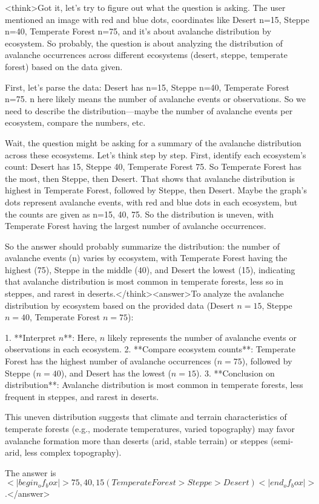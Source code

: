 <think>Got it, let's try to figure out what the question is asking. The user mentioned an image with red and blue dots, coordinates like Desert n=15, Steppe n=40, Temperate Forest n=75, and it's about avalanche distribution by ecosystem. So probably, the question is about analyzing the distribution of avalanche occurrences across different ecosystems (desert, steppe, temperate forest) based on the data given.

First, let's parse the data: Desert has n=15, Steppe n=40, Temperate Forest n=75. n here likely means the number of avalanche events or observations. So we need to describe the distribution—maybe the number of avalanche events per ecosystem, compare the numbers, etc.

Wait, the question might be asking for a summary of the avalanche distribution across these ecosystems. Let's think step by step. First, identify each ecosystem's count: Desert has 15, Steppe 40, Temperate Forest 75. So Temperate Forest has the most, then Steppe, then Desert. That shows that avalanche distribution is highest in Temperate Forest, followed by Steppe, then Desert. Maybe the graph's dots represent avalanche events, with red and blue dots in each ecosystem, but the counts are given as n=15, 40, 75. So the distribution is uneven, with Temperate Forest having the largest number of avalanche occurrences.

So the answer should probably summarize the distribution: the number of avalanche events (n) varies by ecosystem, with Temperate Forest having the highest (75), Steppe in the middle (40), and Desert the lowest (15), indicating that avalanche distribution is most common in temperate forests, less so in steppes, and rarest in deserts.</think><answer>To analyze the avalanche distribution by ecosystem based on the provided data (Desert \( n = 15 \), Steppe \( n = 40 \), Temperate Forest \( n = 75 \)):  

1. **Interpret \( n \)**: Here, \( n \) likely represents the number of avalanche events or observations in each ecosystem.  
2. **Compare ecosystem counts**: Temperate Forest has the highest number of avalanche occurrences (\( n = 75 \)), followed by Steppe (\( n = 40 \)), and Desert has the lowest (\( n = 15 \)).  
3. **Conclusion on distribution**: Avalanche distribution is most common in temperate forests, less frequent in steppes, and rarest in deserts.  

This uneven distribution suggests that climate and terrain characteristics of temperate forests (e.g., moderate temperatures, varied topography) may favor avalanche formation more than deserts (arid, stable terrain) or steppes (semi-arid, less complex topography).  

The answer is \(<|begin_of_box|>75, 40, 15 (Temperate Forest > Steppe > Desert)<|end_of_box|>\).</answer>